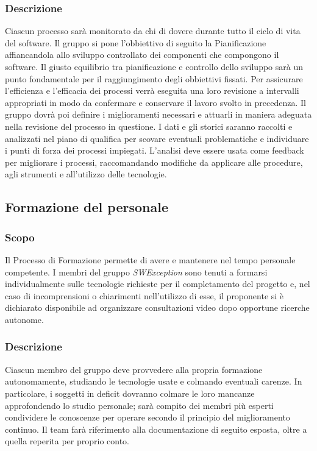 \subsubsection{Descrizione}
Ciascun processo sarà monitorato da chi di dovere durante tutto il ciclo di vita del software. Il gruppo si pone l'obbiettivo di seguito la Pianificazione affiancandola allo sviluppo controllato dei componenti che compongono il software. Il giusto equilibrio tra pianificazione e controllo dello sviluppo sarà un punto fondamentale per il raggiungimento degli obbiettivi fissati. Per assicurare l'efficienza e l'efficacia dei processi verrà eseguita una loro revisione a intervalli appropriati in modo da confermare e conservare il lavoro svolto in precedenza. Il gruppo dovrà poi definire i miglioramenti necessari e attuarli in maniera adeguata nella revisione del processo in questione. I dati e gli storici saranno raccolti e analizzati nel piano di qualifica per scovare eventuali problematiche e individuare i punti di forza dei processi impiegati. L'analisi deve essere usata come feedback per migliorare i processi, raccomandando modifiche da applicare alle procedure, agli strumenti e all'utilizzo delle tecnologie.

\subsection{Formazione del personale} \label{_formazione}
\subsubsection{Scopo}
Il Processo di Formazione permette di avere e mantenere nel tempo personale competente. I membri del gruppo \textit{SWException} sono tenuti a formarsi individualmente sulle tecnologie richieste per il completamento del progetto e, nel caso di incomprensioni o chiarimenti nell'utilizzo di esse, il proponente si è dichiarato disponibile ad organizzare consultazioni video dopo opportune ricerche autonome.
\subsubsection{Descrizione}
Ciascun membro del gruppo deve provvedere alla propria formazione autonomamente,
studiando le tecnologie usate e colmando eventuali carenze. In particolare, i soggetti in
deficit dovranno colmare le loro mancanze approfondendo lo studio personale; sarà compito
dei membri più esperti condividere le conoscenze per operare secondo il principio del miglioramento continuo.
Il team farà riferimento alla documentazione di seguito esposta, oltre a quella reperita per
proprio conto.

